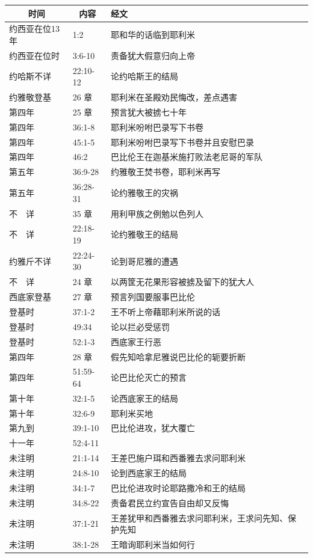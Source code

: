 \begin{table}[H]
\centering
\begin{tabular}{p{3cm}|p{1.40cm}|p{10.40cm}}\hline\hline
\multicolumn{1}{c|}{时间}&\multicolumn{1}{c|}{内容}&经文\\\hline
约西亚在位13年&1:2&耶和华的话临到耶利米\\\hline
约西亚在位时&3:6-10&责备犹大假意归向上帝\\\hline\hline
约哈斯不详&22:10-12&论约哈斯王的结局\\\hline\hline
约雅敬登基&26 章&耶利米在圣殿劝民悔改，差点遇害\\\hline
第四年&25 章&预言犹大被掳七十年\\\hline
第四年&36:1-8&耶利米吩咐巴录写下书卷\\\hline
第四年&45:1-5&耶利米吩咐巴录写下书卷并且安慰巴录\\\hline
第四年&46:2&巴比伦王在迦基米施打败法老尼哥的军队\\\hline
第五年&36:9-28&约雅敬王焚书卷，耶利米再写\\\hline
第五年&36:28-31&论约雅敬王的灾祸\\\hline
不　详&35 章&用利甲族之例勉以色列人\\\hline
不　详&22:18-19&论约雅敬王的结局\\\hline\hline
约雅斤不详&22:24-30&论到哥尼雅的遭遇\\\hline
不　详&24 章&以两筐无花果形容被掳及留下的犹大人\\\hline\hline
西底家登基&27 章&预言列国要服事巴比伦\\\hline
登基时&37:1-2&王不听上帝藉耶利米所说的话\\\hline
登基时&49:34&论以拦必受惩罚\\\hline
登基时&52:1-3&西底家王行恶\\\hline
第四年&28 章&假先知哈拿尼雅说巴比伦的轭要折断\\\hline
第四年&51:59-64&论巴比伦灭亡的预言\\\hline
第十年&32:1-5&论西底家王的结局\\\hline
第十年&32:6-9&耶利米买地\\\hline
第九到&39:1-10&巴比伦进攻，犹大覆亡\\\hline
十一年&52:4-11&\\\hline
未注明&21:1-14&王差巴施户珥和西番雅去求问耶利米\\\hline
未注明&24:8-10&论到西底家王的结局\\\hline
未注明&34:1-7&巴比伦进攻时论耶路撒冷和王的结局\\\hline
未注明&34:8-22&责备君民立约宣告自由却又反悔\\\hline
未注明&37:1-21&王差犹甲和西番雅去求问耶利米，王求问先知、保护先知\\\hline
未注明&38:1-28&王暗询耶利米当如何行\\\hline\hline
\end{tabular}
\end{table}

